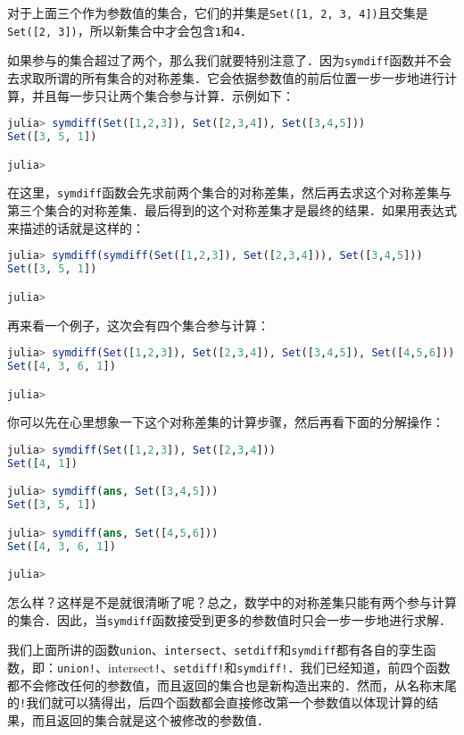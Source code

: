 对于上面三个作为参数值的集合，它们的并集是\verb|Set([1, 2, 3, 4])|且交集是\verb|Set([2, 3])|，所以新集合中才会包含\verb|1|和\verb|4|．

如果参与的集合超过了两个，那么我们就要特别注意了．因为\verb|symdiff|函数并不会去求取所谓的所有集合的对称差集．它会依据参数值的前后位置一步一步地进行计算，并且每一步只让两个集合参与计算．示例如下：

\begin{lstlisting}[language=julia]
julia> symdiff(Set([1,2,3]), Set([2,3,4]), Set([3,4,5]))
Set([3, 5, 1])

julia> 
\end{lstlisting}

在这里，\verb|symdiff|函数会先求前两个集合的对称差集，然后再去求这个对称差集与第三个集合的对称差集．最后得到的这个对称差集才是最终的结果．如果用表达式来描述的话就是这样的：

\begin{lstlisting}[language=julia]
julia> symdiff(symdiff(Set([1,2,3]), Set([2,3,4])), Set([3,4,5]))
Set([3, 5, 1])

julia> 
\end{lstlisting}

再来看一个例子，这次会有四个集合参与计算：

\begin{lstlisting}[language=julia]
julia> symdiff(Set([1,2,3]), Set([2,3,4]), Set([3,4,5]), Set([4,5,6]))
Set([4, 3, 6, 1])

julia> 
\end{lstlisting}

你可以先在心里想象一下这个对称差集的计算步骤，然后再看下面的分解操作：

\begin{lstlisting}[language=julia]
julia> symdiff(Set([1,2,3]), Set([2,3,4]))
Set([4, 1])

julia> symdiff(ans, Set([3,4,5]))
Set([3, 5, 1])

julia> symdiff(ans, Set([4,5,6]))
Set([4, 3, 6, 1])

julia> 
\end{lstlisting}

怎么样？这样是不是就很清晰了呢？总之，数学中的对称差集只能有两个参与计算的集合．因此，当\verb|symdiff|函数接受到更多的参数值时只会一步一步地进行求解．

我们上面所讲的函数\verb|union|、\verb|intersect|、\verb|setdiff|和\verb|symdiff|都有各自的孪生函数，即：\verb|union!|、intersect\verb|!|、\verb|setdiff!|和\verb|symdiff!|．我们已经知道，前四个函数都不会修改任何的参数值，而且返回的集合也是新构造出来的．然而，从名称末尾的\verb|!|我们就可以猜得出，后四个函数都会直接修改第一个参数值以体现计算的结果，而且返回的集合就是这个被修改的参数值．

